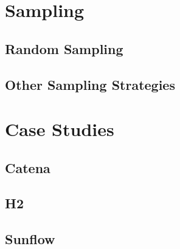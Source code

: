 \section{Sampling}
\label{perf_measure_sampling}


\subsection{Random Sampling}


\subsection{Other Sampling Strategies}



\section{Case Studies}



\subsection{Catena}


\subsection{H2}


\subsection{Sunflow}

